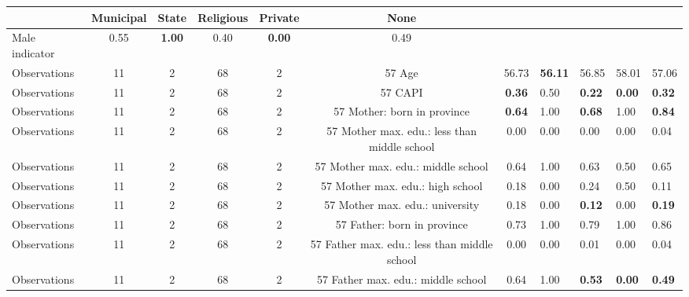 \begin{tabular}{l c c c c c c }
\toprule
& \textbf{Municipal} & \textbf{State} & \textbf{Religious} & \textbf{Private} & \textbf{None} \\
\midrule
Male indicator &      0.55 & \textbf{     1.00} &      0.40 & \textbf{     0.00} &      0.49 \\
\midrule
Observations &        11 &         2 &        68 &         2 &        57
Age &     56.73 & \textbf{    56.11} &     56.85 &     58.01 &     57.06 \\
\midrule
Observations &        11 &         2 &        68 &         2 &        57
CAPI & \textbf{     0.36} &      0.50 & \textbf{     0.22} & \textbf{     0.00} & \textbf{     0.32} \\
\midrule
Observations &        11 &         2 &        68 &         2 &        57
Mother: born in province & \textbf{     0.64} &      1.00 & \textbf{     0.68} &      1.00 & \textbf{     0.84} \\
\midrule
Observations &        11 &         2 &        68 &         2 &        57
Mother max. edu.: less than middle school &      0.00 &      0.00 &      0.00 &      0.00 &      0.04 \\
\midrule
Observations &        11 &         2 &        68 &         2 &        57
Mother max. edu.: middle school &      0.64 &      1.00 &      0.63 &      0.50 &      0.65 \\
\midrule
Observations &        11 &         2 &        68 &         2 &        57
Mother max. edu.: high school &      0.18 &      0.00 &      0.24 &      0.50 &      0.11 \\
\midrule
Observations &        11 &         2 &        68 &         2 &        57
Mother max. edu.: university &      0.18 &      0.00 & \textbf{     0.12} &      0.00 & \textbf{     0.19} \\
\midrule
Observations &        11 &         2 &        68 &         2 &        57
Father: born in province &      0.73 &      1.00 &      0.79 &      1.00 &      0.86 \\
\midrule
Observations &        11 &         2 &        68 &         2 &        57
Father max. edu.: less than middle school &      0.00 &      0.00 &      0.01 &      0.00 &      0.04 \\
\midrule
Observations &        11 &         2 &        68 &         2 &        57
Father max. edu.: middle school &      0.64 &      1.00 & \textbf{     0.53} & \textbf{     0.00} & \textbf{     0.49} \\
\midrule

\end{tabular}
